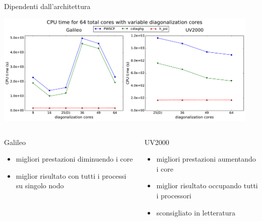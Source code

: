 \documentclass[8pt]{beamer}
\begin{document}
\begin{frame}{Dipendenti dall'architettura}

	\begin{center}
		\includegraphics[width=0.95\textwidth]{beam_ndiag_64.pdf}			
	\end{center}

	\begin{overlayarea}{\linewidth}{\textheight}
	\vspace{-0.6cm}
	\begin{columns}
	\hspace{0.1\textwidth}
		{
		\begin{center}
			\begin{block}{Galileo}
				\begin{itemize}
				\item migliori prestazioni diminuendo i core
				\item miglior risultato con tutti i processi su singolo nodo
				\end{itemize}							
			\end{block}			
		\end{center}
		}
		
		{
		\begin{center}
			\begin{block}{UV2000}
			\begin{itemize}
				\item migliori prestazioni aumentando i core
				\item miglior risultato occupando tutti i processori
				\item sconsigliato in letteratura
				\end{itemize}	
			\end{block}		
		\end{center}
		}
	\end{columns}
	\end{overlayarea}


\end{frame}
\end{document}
